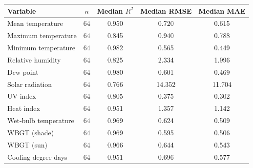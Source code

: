 \begin{tabular}{lcccc}
\toprule
Variable & $n$ & Median $R^{2}$ & Median RMSE & Median MAE \\
\midrule
Mean temperature    & 64 & 0.950 & 0.720 & 0.615 \\
Maximum temperature & 64 & 0.845 & 0.940 & 0.788 \\
Minimum temperature & 64 & 0.982 & 0.565 & 0.449 \\
Relative humidity   & 64 & 0.825 & 2.334 & 1.996 \\
Dew point           & 64 & 0.980 & 0.601 & 0.469 \\
Solar radiation     & 64 & 0.766 & 14.352 & 11.704 \\
UV index            & 64 & 0.805 & 0.375 & 0.302 \\
\midrule
Heat index          & 64 & 0.951 & 1.357 & 1.142 \\
Wet-bulb temperature & 64 & 0.969 & 0.624 & 0.509 \\
WBGT (shade)        & 64 & 0.969 & 0.595 & 0.506 \\
WBGT (sun)          & 64 & 0.966 & 0.644 & 0.543 \\
Cooling degree-days & 64 & 0.951 & 0.696 & 0.577 \\
\bottomrule
\end{tabular}
